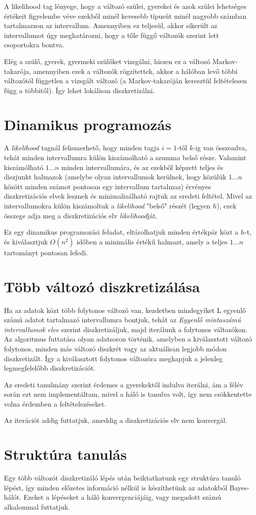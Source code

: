 A likelihood tag lényege, hogy a változó szülei, gyerekei és azok szülei lehetséges értékeit figyelembe véve ezekből minél kevesebb típusút minél nagyobb számban tartalmazzon az intervallum. Amennyiben ez teljesül, akkor sikerült az intervallumot úgy meghatározni, hogy a tőle függő változók szerint lett csoportokra bontva.

Elég a szülő, gyerek, gyermeki szülőket vizsgálni, hiszen ez a változó Markov-takarója, amennyiben ezek a változók rögzítettek, akkor a hálóban levő többi változótól független a vizsgált változó (a Markov-takaróján keresztül feltételesen függ a többitől). Így lehet lokálisan diszkretizálni.

\section{Dinamikus programozás}
A \textit{likelihood} tagnál felismerhető, hogy minden tagja $i=1$-től $k$-ig van összeadva, tehát minden intervallumra külön kiszámolható a szumma belső része. Valamint kiszámólható $1 \dotsc n$ minden intervallumára, és az ezekből képzett teljes és diszjunkt halmazok (amelybe olyan intervallumok kerülnek, hogy közülük $1 \dotsc n$ között minden számot pontosan egy intervallum tartalmaz) érvényes diszkretizációs elvek lesznek és minimalizálható rajtuk az eredeti feltétel. Mivel az intervallumokra külön kiszámoltuk a \textit{likelihood} "belső" részét (legyen $h$), ezek összege adja meg a diszkretizációs elv \textit{likelihood}ját.

Ez egy dinamikus programozási feladat, eltárolhatjuk minden értékpár közt a $h$-t, és kiválasztjuk $O(n^2)$ időben a minimális értékű halmazt, amely a teljes $1 \dotsc n$ tartományt pontosan lefedi.

\section{Több változó diszkretizálása}
Ha az adatok közt több folytonos változó van, kezdetben mindegyiket L egyenlő számú adatot tartalmazó intervallumra bontjuk, tehát az \textit{Egyenlő mintaszámú intervallumok elve} szerint diszkretizáljuk,  majd iterálunk a folytonos változókon. Az algoritmus futtatása olyan adatsoron történik, amelyben a kiválasztott változó folytonos, minden más változó diszkrét vagy az aktuálisan legjobb módon diszkretizált. Így a kiválasztott folytonos változóra megkapjuk a jelenleg legmegfelelőbb diszkretizációt.

Az eredeti tanulmány szerint érdemes a gyerekektől indulva iterálni, ám a félév során ezt nem implementáltam, mivel a háló is tanulva volt, így nem csökkentette volna érdemben a feltételezéseket.

Az iterációt addig futtatjuk, ameddig a diszkretizációs elv nem konvergál.

\section{Struktúra tanulás}
Egy több változót diszkretizáló lépés után beiktathatunk egy struktúra tanuló lépést, így minden előzetes információ nélkül is készíthetünk az adatokból Bayes-hálót. Ezeket a lépéseket a háló konvergenciájáig, vagy megadott számú alkalommal futtatjuk.